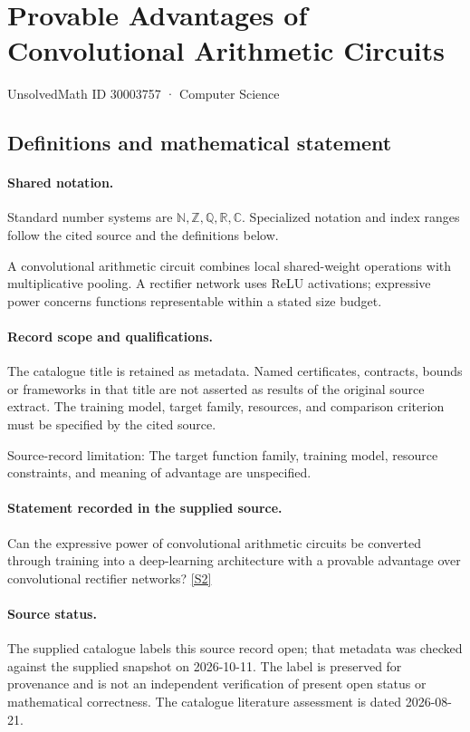 \documentclass[11pt]{article}
\newcommand{\sref}[2]{\hyperlink{source:#1:#2}{[S#2]}}
\begin{document}
\setcounter{section}{30003756}
\section{Provable Advantages of Convolutional Arithmetic Circuits}\label{30003757}
{\small\sffamily UnsolvedMath ID 30003757 · Computer Science}
\subsection{Definitions and mathematical statement}

\paragraph{Shared notation.}Standard number systems are $\mathbb N,\mathbb Z,\mathbb Q,\mathbb R,\mathbb C$. Specialized notation and index ranges follow the cited source and the definitions below.


A convolutional arithmetic circuit combines local shared-weight operations with multiplicative pooling. A rectifier network uses ReLU activations; expressive power concerns functions representable within a stated size budget.
\paragraph{Record scope and qualifications.}
The catalogue title is retained as metadata. Named certificates, contracts, bounds or frameworks in that title are not asserted as results of the original source extract.
The training model, target family, resources, and comparison criterion must be specified by the cited source.

Source-record limitation: The target function family, training model, resource constraints, and meaning of advantage are unspecified.
\paragraph{Statement recorded in the supplied source.}
Can the expressive power of convolutional arithmetic circuits be converted through training into a deep-learning architecture with a provable advantage over convolutional rectifier networks? \sref{30003757}{2}
\paragraph{Source status.}
The supplied catalogue labels this source record open; that metadata was checked against the supplied snapshot on 2026-10-11. The label is preserved for provenance and is not an independent verification of present open status or mathematical correctness. The catalogue literature assessment is dated 2026-08-21.
\end{document}
